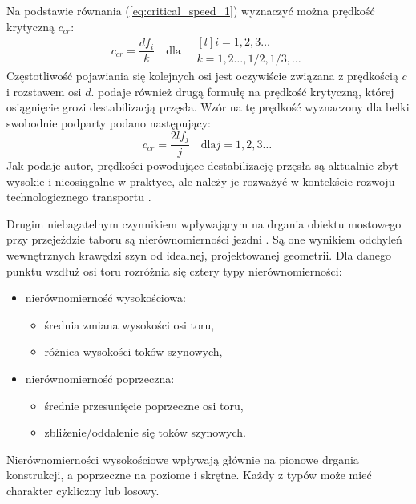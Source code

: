 Na podstawie równania (\ref{eq:critical_speed_1}) wyznaczyć można prędkość krytyczną $c_{cr}$:
\begin{equation} \label{eq:critical_speed_2}
	c_{cr}=\frac{df_i}{k}\quad \text{dla}\quad
		\begin{matrix*}[l]
		i=1,2,3\dots\ \\
		k=1,2\dots,1/2,1/3,\dots
	\end{matrix*}
\end{equation}
Częstotliwość pojawiania się kolejnych osi jest oczywiście związana z prędkością $c$ i rozstawem osi $d$. \cite{Fryba2001} podaje również drugą formułę na prędkość krytyczną, której osiągnięcie grozi destabilizacją przęsła. Wzór na tę prędkość wyznaczony dla belki swobodnie podparty podano następujący:
\begin{equation}
	c_{cr}=\frac{2lf_j}{j}\quad\text{dla}j=1,2,3\dots\ 
\end{equation}
Jak podaje autor, prędkości powodujące destabilizację przęsła są aktualnie zbyt wysokie i nieosiągalne w praktyce, ale należy je rozważyć w kontekście rozwoju technologicznego transportu \parencite{Ladislav2008}.

Drugim niebagatelnym czynnikiem wpływającym na drgania obiektu mostowego przy przejeździe taboru są nierównomierności jezdni \parencite{Ladislav1996}. Są one wynikiem odchyleń wewnętrznych krawędzi szyn od idealnej, projektowanej geometrii. Dla danego punktu wzdłuż osi toru rozróżnia się cztery typy nierównomierności:
\begin{itemize}[noitemsep]
	\item nierównomierność wysokościowa:
	\begin{itemize}
		\item średnia zmiana wysokości osi toru,
		\item różnica wysokości toków szynowych,
	\end{itemize}
	\item nierównomierność poprzeczna:
	\begin{itemize}
		\item średnie przesunięcie poprzeczne osi toru,
		\item zbliżenie/oddalenie się toków szynowych.
	\end{itemize}
\end{itemize}
Nierównomierności wysokościowe wpływają głównie na pionowe drgania konstrukcji, a poprzeczne na poziome i skrętne. Każdy z typów może mieć charakter cykliczny lub losowy. 

